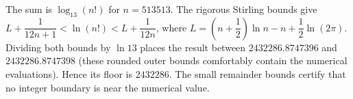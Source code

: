 The sum is $\log_{13}(n!)$ for $n=513513$. The rigorous Stirling bounds give $L+\dfrac{1}{12n+1}<\ln(n!)<L+\dfrac{1}{12n}$, where $L=(n+\dfrac{1}{2})\ln n-n+\dfrac{1}{2}\ln(2\pi)$. Dividing both bounds by $\ln13$ places the result between $2432286.8747396$ and $2432286.8747398$ (these rounded outer bounds comfortably contain the numerical evaluations). Hence its floor is $\boxed{2432286}$. The small remainder bounds certify that no integer boundary is near the numerical value.

